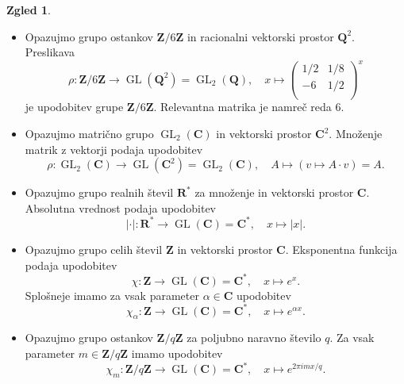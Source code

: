 \documentclass[11pt]{book}
\def\ZZ{\mathbf{Z}}
\def\QQ{\mathbf{Q}}
\def\RR{\mathbf{R}}
\def\CC{\mathbf{C}}
\DeclareMathOperator\GL{GL}
\theoremstyle{definition}
\theoremstyle{zgled}
\newtheorem*{zgled}{Zgled}
\theoremstyle{odprtproblem}
\theoremstyle{domacanaloga}
\theoremstyle{izrek}
\begin{document}
\begin{zgled} \leavevmode
    \begin{itemize}
        \item Opazujmo grupo ostankov $\ZZ/6\ZZ$ in racionalni vektorski prostor $\QQ^2$. Preslikava
        \[
            \rho \colon \ZZ/6\ZZ \to \GL(\QQ^2) = {\textstyle \GL_2(\QQ)}, \quad
            x \mapsto  \begin{pmatrix}
                1/2 & 1/8 \\
                -6 & 1/2 \\
            \end{pmatrix}^x
        \]
        je upodobitev grupe $\ZZ/6\ZZ$. Relevantna matrika je namreč reda $6$.

        \item Opazujmo matrično grupo $\GL_2(\CC)$ in vektorski prostor $\CC^2$. Množenje matrik z vektorji podaja upodobitev
        \[
            \textstyle \rho \colon \GL_2(\CC) \to \GL(\CC^2) = \GL_2(\CC), \quad
            A \mapsto \left( v \mapsto A \cdot v \right) = A.
        \]

        \item Opazujmo grupo realnih števil $\RR^*$ za množenje in vektorski prostor $\CC$. Absolutna vrednost podaja upodobitev
        \[
            |\cdot| \colon \RR^* \to \GL(\CC) = \CC^*, \quad
            x \mapsto |x|.
        \]
        \item Opazujmo grupo celih števil $\ZZ$ in vektorski prostor $\CC$. Eksponentna funkcija podaja upodobitev
        \[
            \chi \colon \ZZ \to \GL(\CC) = \CC^*, \quad
            x \mapsto e^x.
        \]
        Splošneje imamo za vsak parameter $\alpha \in \CC$ upodobitev
        \[
            \chi_{\alpha} \colon \ZZ \to \GL(\CC) = \CC^*, \quad
            x \mapsto e^{\alpha x}.
        \] 
        \item Opazujmo grupo ostankov $\ZZ/q\ZZ$ za poljubno naravno število $q$. Za vsak parameter $m \in \ZZ/q\ZZ$ imamo upodobitev
        \[
            \chi_m \colon \ZZ/q\ZZ \to \GL(\CC) = \CC^*, \quad
            x \mapsto e^{2 \pi i mx/q}.
        \]


\end{itemize}
\end{zgled}
\end{document}
